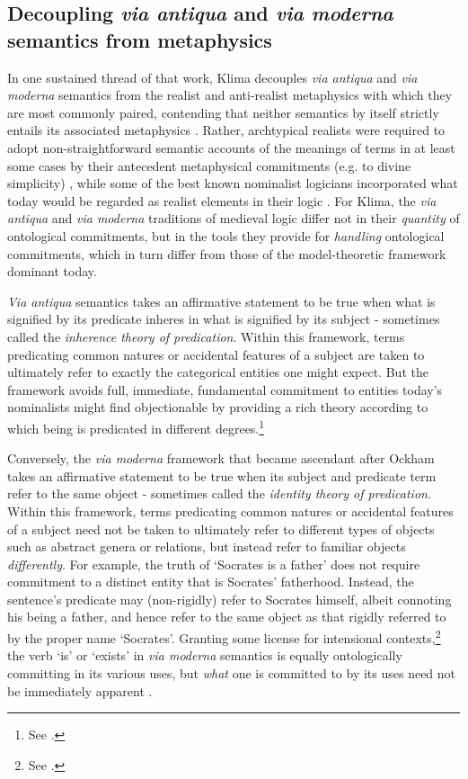 \documentclass[]{article}
\begin{document}
\subsection{Decoupling \emph{via antiqua} and \emph{via moderna} semantics from metaphysics}
In one sustained thread of that work, 
Klima decouples \emph{via antiqua} and \emph{via moderna} semantics 
from the realist and anti-realist metaphysics with which they are most commonly paired,
contending that neither semantics by itself strictly entails its associated metaphysics \autocite{Klima1999,Klima2011}. 
Rather, archtypical realists were required to adopt non-straightforward semantic accounts of the meanings of terms in at least some cases by their antecedent metaphysical commitments (e.g. to divine simplicity) \autocite{Klima2002b},
while some of the best known nominalist logicians incorporated what today would be regarded as realist elements in their logic \autocite{Klima2005}. 
For Klima, the \emph{via antiqua} and \emph{via moderna} traditions of medieval logic 
differ not in their \emph{quantity} of ontological commitments, 
but in the tools they provide for \emph{handling} ontological commitments, 
which in turn differ from those of the model-theoretic framework dominant today. 

\emph{Via antiqua} semantics takes an affirmative statement to be true when what is signified by its predicate inheres in what is signified by its subject - 
sometimes called the \emph{inherence theory of predication}. 
Within this framework, 
terms predicating common natures or accidental features of a subject are taken to ultimately refer to exactly the categorical entities one might expect. 
But the framework 
avoids full, immediate, fundamental commitment to entities today's nominalists might find objectionable by providing a rich theory according to which being is predicated in different degrees.\footnote{See \autocite{Klima2002}.}

Conversely, the \emph{via moderna} framework that became ascendant after Ockham 
takes an affirmative statement to be true when its subject and predicate term refer to the same object 
 - sometimes called the \emph{identity theory of predication}. 
Within this framework, 
terms predicating common natures or accidental features of a subject need not be taken to ultimately refer to different types of objects such as abstract genera or relations, 
but instead refer to familiar objects \emph{differently}. 
For example, the truth of `Socrates is a father' does not require commitment to a distinct entity that is Socrates' fatherhood.
Instead, the sentence's predicate may (non-rigidly) refer to Socrates himself, 
albeit connoting his being a father, 
and hence refer to the same object as that rigidly referred to by the proper name `Socrates'. 
Granting some license for intensional contexts,\footnote{See \autocite{Klima2005}.} 
the verb `is' or `exists' in \emph{via moderna} semantics is equally ontologically committing in its various uses, 
but \emph{what} one is committed to by its uses need not be immediately apparent  \autocite[437-430]{Klima2008a}. 
\end{document}

